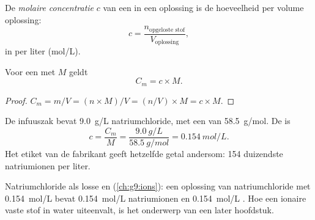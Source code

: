 \begin{definition}\label{def:g10:concentration-and-dilution:molar-concentration}
De \emph{molaire concentratie} $c$ van een
 in een oplossing is de hoeveelheid  per
volume oplossing:
\[
  c = \frac{n_{\text{opgeloste stof}}}{V_{\text{oplossing}}},
\]
in  per liter (\si{mol/L}).
\end{definition}

\begin{proposition}\label{prop:g10:concentration-and-dilution:link}
Voor een  met  $M$ geldt
\[
  C_m = c \times M .
\]
\end{proposition}

\begin{proof}
$C_m = m / V = (n \times M) / V = (n / V) \times M = c \times M$.
\end{proof}

\begin{example}\label{ex:g10:concentration-and-dilution:drip}
De infuuszak bevat \qty{9.0}{g/L} natriumchloride, met een 
van \qty{58.5}{g/mol}. De  is
\[
  c = \frac{C_m}{M} = \frac{\qty{9.0}{g/L}}{\qty{58.5}{g/mol}}
    = \qty{0.154}{mol/L}.
\]
Het etiket van de fabrikant geeft hetzelfde getal andersom: 154
duizendste  natriumionen per liter.
\end{example}

\begin{remark}\label{rem:g10:concentration-and-dilution:ions}
Natriumchloride  als losse   en 
(\cref{ch:g9:ions}): een oplossing van natriumchloride met
\qty{0.154}{mol/L} bevat \qty{0.154}{mol/L} natriumionen en
\qty{0.154}{mol/L} . Hoe een ionaire vaste stof in water
uiteenvalt, is het onderwerp van een later hoofdstuk.
\end{remark}

